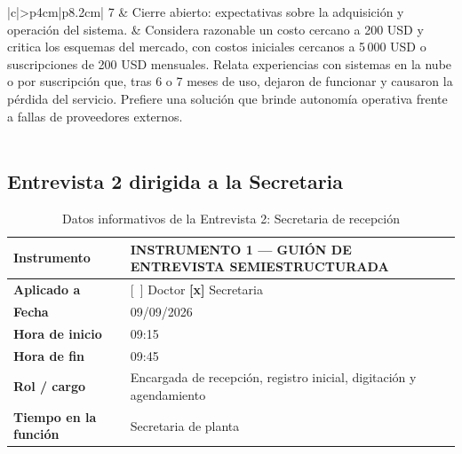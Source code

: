 \begin{longtable}{|c|>{\bfseries}p{4cm}|p{8.2cm}|}
7 &
Cierre abierto: expectativas sobre la adquisición y operación del sistema. &
Considera razonable un costo cercano a 200 USD y critica los esquemas del mercado, con costos iniciales cercanos a 5\,000 USD o suscripciones de 200 USD mensuales. Relata experiencias con sistemas en la nube o por suscripción que, tras 6 o 7 meses de uso, dejaron de funcionar y causaron la pérdida del servicio. Prefiere una solución que brinde autonomía operativa frente a fallas de proveedores externos.
\\ \hline
{} \\ \hline

\end{longtable}
\endgroup


\subsection*{Entrevista 2 dirigida a la Secretaria}

\begin{table}[H]
\centering
\caption{Datos informativos de la Entrevista 2: Secretaria de recepción}
\label{tab:ent2_datos}
\fontsize{10}{12}\selectfont
\renewcommand{\arraystretch}{1.2}
\begin{tabularx}{\linewidth}{|>{\bfseries}p{3.8cm}|X|}
\hline
Instrumento & INSTRUMENTO 1 — GUIÓN DE ENTREVISTA SEMIESTRUCTURADA \\ \hline
Aplicado a  & \mbox{[~]} Doctor \quad \textbf{[x]} Secretaria \\ \hline
Fecha       & 09/09/2026 \\ \hline
Hora de inicio & 09:15 \\ \hline
Hora de fin    & 09:45 \\ \hline
Rol / cargo & Encargada de recepción, registro inicial, digitación y agendamiento \\ \hline
Tiempo en la función & Secretaria de planta \\ \hline
\end{tabularx}
\end{table}

